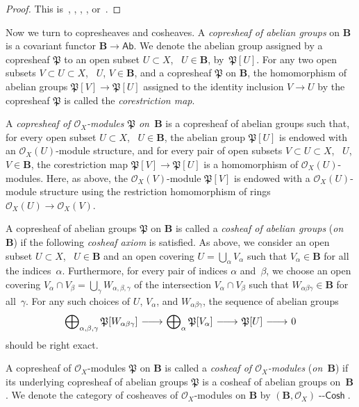 \documentclass[12pt,a4paper]{amsart}
\newcommand{\+}{\nobreakdash-}
\renewcommand{\:}{\colon}
\newcommand{\rarrow}{\longrightarrow}
\newcommand{\lrarrow}{\mskip.5\thinmuskip\relbar\joinrel\relbar
   \joinrel\rightarrow\mskip.5\thinmuskip\relax}
\newcommand{\Cosh}{{\operatorname{\mathsf{--Cosh}}}}
\newcommand{\Ab}{\mathsf{Ab}}
\newcommand{\bB}{\mathbf B}
\newcommand{\cO}{\mathcal O}
\newcommand{\fP}{\mathfrak P}
\theoremstyle{plain}
\theoremstyle{definition}
\begin{document}
\begin{proof}
 This is~\cite[Section~0.3.2]{EGAI}, \cite[Lemma Tag~009U]{SP},
\cite[Proposition~2.1.3]{Pcosh}, \cite[Theorem~2.1(a)]{Pdomc},
or~\cite[Section~3.2]{Pform}.
\end{proof}

 Now we turn to copresheaves and cosheaves.
 A \emph{copresheaf of abelian groups} on\/ $\bB$ is a covariant
functor $\bB\rarrow\Ab$.
 We denote the abelian group assigned by a copresheaf $\fP$ to
an open subset $U\subset X$, \ $U\in\bB$, by~$\fP[U]$.
 For any two open subsets $V\subset U\subset X$, \ $U$, $V\in\bB$,
and a copresheaf $\fP$ on $\bB$, the homomorphism of abelian groups
$\fP[V]\rarrow\fP[U]$ assigned to the identity inclusion $V\rarrow U$
by the copresheaf $\fP$ is called the \emph{corestriction map}.

 A \emph{copresheaf of\/ $\cO_X$\+modules\/ $\fP$ on\/~$\bB$} is
a copresheaf of abelian groups such that, for every open subset
$U\subset X$, \ $U\in\bB$, the abelian group $\fP[U]$ is endowed with
an $\cO_X(U)$\+module structure, and for every pair of open subsets
$V\subset U\subset X$, \ $U$, $V\in\bB$, the corestriction map
$\fP[V]\rarrow\fP[U]$ is a homomorphism of $\cO_X(U)$\+modules.
 Here, as above, the $\cO_X(V)$\+module $\fP[V]$ is endowed with
a $\cO_X(U)$\+module structure using the restriction homomorphism
of rings $\cO_X(U)\rarrow\cO_X(V)$.

 A copresheaf of abelian groups $\fP$ on $\bB$ is called a \emph{cosheaf
of abelian groups} (\emph{on\/~$\bB$}) if the following \emph{cosheaf
axiom} is satisfied.
 As above, we consider an open subset $U\subset X$, \ $U\in\bB$
and an open covering $U=\bigcup_\alpha V_\alpha$ such that
$V_\alpha\in\bB$ for all the indices~$\alpha$.
 Furthermore, for every pair of indices $\alpha$ and~$\beta$,
we choose an open covering $V_\alpha\cap V_\beta=
\bigcup_\gamma W_{\alpha,\beta,\gamma}$ of the intersection
$V_\alpha\cap V_\beta$ such that $W_{\alpha\beta\gamma}\in\bB$
for all~$\gamma$.
 For any such choices of $U$, $V_\alpha$, and $W_{\alpha\beta\gamma}$,
the sequence of abelian groups
\begin{equation} \label{cosheaf-axiom-for-topology-base}
 \bigoplus\nolimits_{\alpha,\beta,\gamma}\fP[W_{\alpha\beta\gamma}]
 \lrarrow\bigoplus\nolimits_\alpha\fP[V_\alpha]\lrarrow\fP[U]\lrarrow0
\end{equation}
should be right exact.

 A copresheaf of $\cO_X$\+modules $\fP$ on $\bB$ is called
a \emph{cosheaf of\/ $\cO_X$\+modules} (\emph{on\/~$\bB$}) if its
underlying copresheaf of abelian groups $\fP$ is a cosheaf of abelian
groups on~$\bB$.
 We denote the category of cosheaves of $\cO_X$\+modules on $\bB$ by
$(\bB,\cO_X)\Cosh$.
\end{document}
